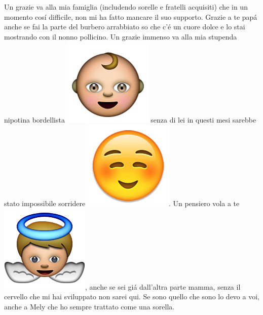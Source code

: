 \noindent Un grazie va alla mia famiglia (includendo sorelle e fratelli acquisiti) che in un momento cos\'i difficile, non mi ha fatto mancare il suo supporto. Grazie a te pap\'a anche se fai la parte del burbero arrabbiato so che c'\'e un cuore dolce e lo stai mostrando con il nonno pollicino. Un grazie immenso va alla mia stupenda nipotina bordellista \includegraphics[height=1.5\fontcharht\font`A]{figures/ack/EmojiSmiley/EmojiSmiley-64.png} senza di lei in questi mesi sarebbe stato impossibile sorridere \includegraphics[height=1.5\fontcharht\font`A]{figures/ack/EmojiSmiley/EmojiSmiley-05.png}. Un pensiero vola a te \includegraphics[height=1.5\fontcharht\font`A]{figures/ack/EmojiSmiley/EmojiSmiley-72.png}, anche se sei gi\'a dall'altra parte mamma, senza il cervello che mi hai sviluppato non sarei qui. Se sono quello che sono lo devo a voi, anche a Mely che ho sempre trattato come una sorella.\\ 


